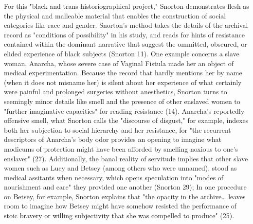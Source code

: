\documentclass[11pt]{article}
\begin{document}
For this "black and trans historiographical project," Snorton
demonstrates flesh as the physical and malleable material that enables
the construction of social categories like race and gender. Snorton's
method takes the details of the archival record as "conditions of
possibility" in his study, and reads for hints of resistance contained
within the dominant narrative that suggest the ommitted, obscured, or
elided experience of black subjects (Snorton 11). One example concerns
a slave woman, Anarcha, whose severe case of Vaginal Fistula made her
an object of medical experimentation. Because the record that hardly
mentions her by name (when it does not misname her) is silent about
her experience of what certainly were painful and prolonged surgeries
without anesthetics, Snorton turns to seemingly minor details like
smell and the presence of other enslaved women to "further imaginative
capacities" for reading resistance (14). Anarcha's reportedly
offensive smell, what Snorton calls the "discourse of disgust," for
example, indexes both her subjection to social hierarchy and her
resistance, for "the recurrent descriptors of Anarcha's body odor
provides an opening to imagine what modicums of protection might have
been afforded by smelling noxious to one's enslaver"
(27). Additionally, the banal reality of servitude implies that other
slave women such as Lucy and Betsey (among others who were unnamed),
stood as medical assitants when necessary, which opens speculation
into "modes of nourishment and care" they provided one another
(Snorton 29); In one procedure on Betsey, for example, Snorton
explains that "the opacity in the archive\ldots{} leaves room to imagine
how Betsey might have somehow resisted the performance of stoic
bravery or willing subjectivity that she was compelled to produce"
(25).
\end{document}
